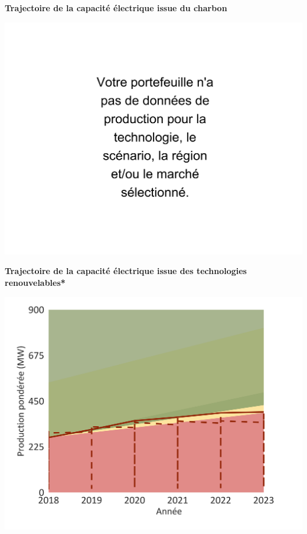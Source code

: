 \documentclass[10pt,table,a4]{article}\usepackage[]{graphicx}\usepackage[]{color}
\begin{document}
	\begin{minipage}[t]{.49\linewidth}
			\begin{center}
		\textbf{Trajectoire de la capacité électrique issue du charbon }
			\end{center}
		\includegraphics[trim = {0 0cm 0 0},width=1\linewidth]{ReportOutputs/Fig17}
		\vspace{-0.4cm}
			\begin{center}
		\textbf{Trajectoire de la capacité électrique issue des technologies renouvelables* }
			\end{center}
		\includegraphics[trim = {0 0cm 0 0},width=.99\linewidth]{ReportOutputs/Fig18}
	\end{minipage}	
\end{document}
